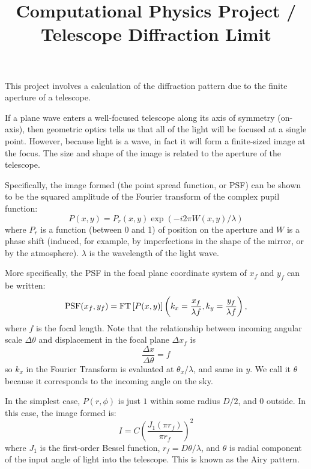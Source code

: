 \documentclass[11pt, preprint]{aastex}
\begin{document}
\title{\bf Computational Physics Project / Telescope Diffraction Limit}

This project involves a calculation of the diffraction pattern due to
the finite aperture of a telescope.

If a plane wave enters a well-focused telescope along its axis of
symmetry (on-axis), then geometric optics tells us that all of the
light will be focused at a single point. However, because light is a
wave, in fact it will form a finite-sized image at the focus. The size
and shape of the image is related to the aperture of the telescope.

Specifically, the image formed (the point spread function, or PSF) can
be shown to be the squared amplitude of the Fourier transform of the
complex pupil function:
\begin{equation}
P(x,y) = P_r(x, y) \exp\left(-i 2\pi W(x, y) / \lambda\right)
\end{equation}
where $P_r$ is a function (between 0 and 1) of position on the
aperture and $W$ is a phase shift (induced, for example, by
imperfections in the shape of the mirror, or by the
atmosphere). $\lambda$ is the wavelength of the light wave.

More specifically, the PSF in the focal plane coordinate system of
$x_f$ and $y_f$ can be written:
\begin{equation}
{\rm PSF}(x_f, y_f) = {\rm FT}\left[P(x, y)\right]\left(k_x=
\frac{x_f}{\lambda f}, k_y = \frac{y_f}{\lambda f}\right),
\end{equation}
where $f$ is the focal length. Note that the relationship between
incoming angular scale $\Delta\theta$ and displacement in the focal
plane $\Delta x_f$ is
\begin{equation}
\frac{\Delta x}{\Delta\theta} = f
\end{equation}
so $k_x$ in the Fourier Transform is evaluated at $\theta_x /
\lambda$, and same in $y$. We call it $\theta$ because it corresponds
to the incoming angle on the sky.

In the simplest case, $P(r, \phi)$ is just $1$ within some radius
$D/2$, and $0$ outside.  In this case, the image formed is:
\begin{equation}
I = C\left(\frac{J_1(\pi r_f)}{\pi r_f}\right)^2
\end{equation}
where $J_1$ is the first-order Bessel function, $r_f=
D\theta/\lambda$, and $\theta$ is radial component of the input angle
of light into the telescope.  This is known as the Airy pattern.
\end{document}
